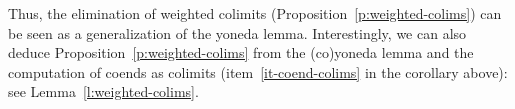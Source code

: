 \documentclass{article}
\newtheorem{lemma}[theorem]{Lemma}
\begin{document}
Thus, the elimination of weighted colimits (Proposition~\ref{p:weighted-colims}) can be seen as a generalization
of the yoneda lemma.
Interestingly, we can also deduce Proposition~\ref{p:weighted-colims} from
the (co)yoneda lemma and the computation of coends as colimits
(item~\ref{it-coend-colims} in the corollary above): see Lemma~\ref{l:weighted-colims}.


\end{document}
